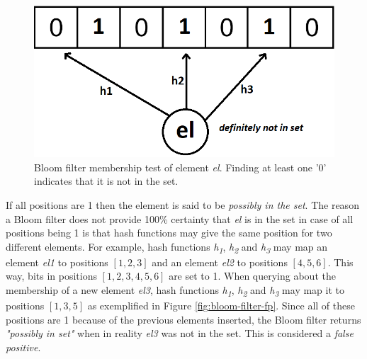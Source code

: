 \begin{figure}[!htb]
    \begin{center}
      \includegraphics[scale=0.4]{figures/query-bloom.png}
      \caption[Bloom filter membership query]{Bloom filter membership test of element \textit{el}. Finding at least one '0' indicates that it is not in the set.}
      \label{fig:bloom-filter}
    \end{center}
\end{figure}

If all positions are 1 then the element is said to be \textit{possibly in the set}. The reason a Bloom filter does not provide 100\% certainty that \textit{el} is in the set in case of all positions being 1 is that hash functions may give the same position for two different elements. For example, hash functions \textit{h\textsubscript{1}}, \textit{h\textsubscript{2}} and \textit{h\textsubscript{3}} may map an element \textit{el1} to positions $[1,2,3]$ and an element \textit{el2} to positions $[4,5,6]$. This way, bits in positions $[1,2,3,4,5,6]$ are set to 1. When querying about the membership of a new element \textit{el3}, hash functions \textit{h\textsubscript{1}}, \textit{h\textsubscript{2}} and \textit{h\textsubscript{3}} may map it to positions $[1,3,5]$ as exemplified in Figure \ref{fig:bloom-filter-fp}. Since all of these positions are 1 because of the previous elements inserted, the Bloom filter returns \textit{"possibly in set"} when in reality \textit{el3} was not in the set. This is considered a \textit{false positive}.

